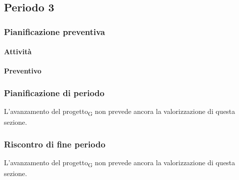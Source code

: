 \subsection{Periodo 3}

\subsubsection{Pianificazione preventiva}

\paragraph{Attività}

\planningTable{
	
}

\paragraph{Preventivo}

\smallPreventivoTable{
	
}


\subsubsection{Pianificazione di periodo}


L'avanzamento del progetto\textsubscript{G} non prevede ancora la valorizzazione di questa sezione.



\subsubsection{Riscontro di fine periodo}


L'avanzamento del progetto\textsubscript{G} non prevede ancora la valorizzazione di questa sezione.
